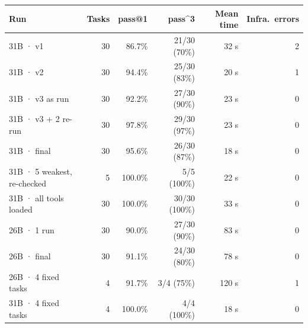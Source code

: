 \begin{tabular}{@{}lrrrrr@{}}
\toprule
Run & Tasks & pass@1 & pass\textasciicircum{}3 & Mean time & Infra.\ errors \\
\midrule
31B · v1 & 30 & 86.7\% & 21/30 (70\%) & 32 s & 2 \\
31B · v2 & 30 & 94.4\% & 25/30 (83\%) & 20 s & 1 \\
31B · v3 as run & 30 & 92.2\% & 27/30 (90\%) & 23 s & 0 \\
31B · v3 + 2 re-run & 30 & 97.8\% & 29/30 (97\%) & 23 s & 0 \\
31B · final & 30 & 95.6\% & 26/30 (87\%) & 18 s & 0 \\
31B · 5 weakest, re-checked & 5 & 100.0\% & 5/5 (100\%) & 22 s & 0 \\
31B · all tools loaded & 30 & 100.0\% & 30/30 (100\%) & 33 s & 0 \\
26B · 1 run & 30 & 90.0\% & 27/30 (90\%) & 83 s & 0 \\
26B · final & 30 & 91.1\% & 24/30 (80\%) & 78 s & 0 \\
26B · 4 fixed tasks & 4 & 91.7\% & 3/4 (75\%) & 120 s & 1 \\
31B · 4 fixed tasks & 4 & 100.0\% & 4/4 (100\%) & 18 s & 0 \\
\bottomrule
\end{tabular}

